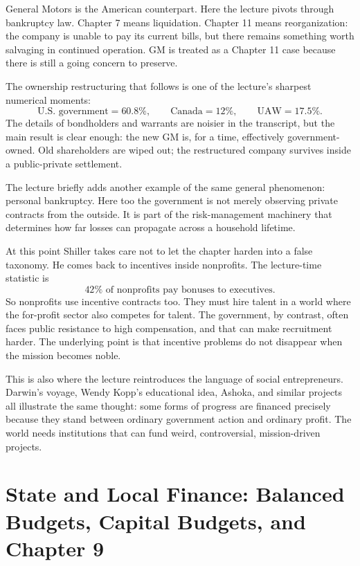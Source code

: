 General Motors is the American counterpart. Here the lecture pivots through bankruptcy law. Chapter 7 means liquidation. Chapter 11 means reorganization: the company is unable to pay its current bills, but there remains something worth salvaging in continued operation. GM is treated as a Chapter 11 case because there is still a going concern to preserve.

The ownership restructuring that follows is one of the lecture's sharpest numerical moments:
\begin{equation}
\text{U.S. government} = 60.8\%,
\qquad
\text{Canada} = 12\%,
\qquad
\text{UAW} = 17.5\%.
\end{equation}
The details of bondholders and warrants are noisier in the transcript, but the main result is clear enough: the new GM is, for a time, effectively government-owned. Old shareholders are wiped out; the restructured company survives inside a public-private settlement.

The lecture briefly adds another example of the same general phenomenon: personal bankruptcy. Here too the government is not merely observing private contracts from the outside. It is part of the risk-management machinery that determines how far losses can propagate across a household lifetime.

At this point Shiller takes care not to let the chapter harden into a false taxonomy. He comes back to incentives inside nonprofits. The lecture-time statistic is
\begin{equation}
42\% \text{ of nonprofits pay bonuses to executives.}
\end{equation}
So nonprofits use incentive contracts too. They must hire talent in a world where the for-profit sector also competes for talent. The government, by contrast, often faces public resistance to high compensation, and that can make recruitment harder. The underlying point is that incentive problems do not disappear when the mission becomes noble.

This is also where the lecture reintroduces the language of social entrepreneurs. Darwin's voyage, Wendy Kopp's educational idea, Ashoka, and similar projects all illustrate the same thought: some forms of progress are financed precisely because they stand between ordinary government action and ordinary profit. The world needs institutions that can fund weird, controversial, mission-driven projects.

\section{State and Local Finance: Balanced Budgets, Capital Budgets, and Chapter 9}

